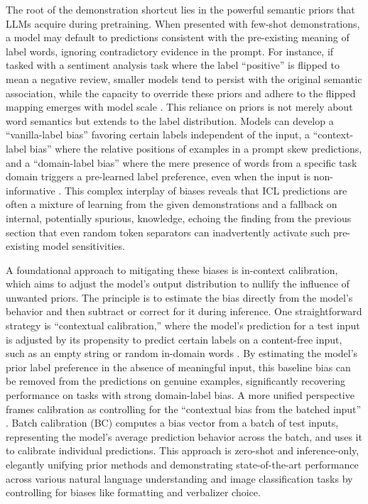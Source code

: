 \documentclass[11pt]{article}
\begin{document}
The root of the demonstration shortcut lies in the powerful semantic priors that LLMs acquire during pretraining. When presented with few-shot demonstrations, a model may default to predictions consistent with the pre-existing meaning of label words, ignoring contradictory evidence in the prompt. For instance, if tasked with a sentiment analysis task where the label ``positive'' is flipped to mean a negative review, smaller models tend to persist with the original semantic association, while the capacity to override these priors and adhere to the flipped mapping emerges with model scale \cite{ref176}. This reliance on priors is not merely about word semantics but extends to the label distribution. Models can develop a ``vanilla-label bias'' favoring certain labels independent of the input, a ``context-label bias'' where the relative positions of examples in a prompt skew predictions, and a ``domain-label bias'' where the mere presence of words from a specific task domain triggers a pre-learned label preference, even when the input is non-informative \cite{ref177}. This complex interplay of biases reveals that ICL predictions are often a mixture of learning from the given demonstrations and a fallback on internal, potentially spurious, knowledge, echoing the finding from the previous section that even random token separators can inadvertently activate such pre-existing model sensitivities.

A foundational approach to mitigating these biases is in-context calibration, which aims to adjust the model's output distribution to nullify the influence of unwanted priors. The principle is to estimate the bias directly from the model's behavior and then subtract or correct for it during inference. One straightforward strategy is ``contextual calibration,'' where the model's prediction for a test input is adjusted by its propensity to predict certain labels on a content-free input, such as an empty string or random in-domain words \cite{ref177}. By estimating the model's prior label preference in the absence of meaningful input, this baseline bias can be removed from the predictions on genuine examples, significantly recovering performance on tasks with strong domain-label bias. A more unified perspective frames calibration as controlling for the ``contextual bias from the batched input'' \cite{ref178}. Batch calibration (BC) computes a bias vector from a batch of test inputs, representing the model's average prediction behavior across the batch, and uses it to calibrate individual predictions. This approach is zero-shot and inference-only, elegantly unifying prior methods and demonstrating state-of-the-art performance across various natural language understanding and image classification tasks by controlling for biases like formatting and verbalizer choice.
\end{document}
